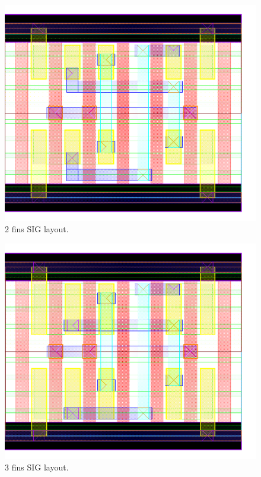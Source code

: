 \documentclass[pgmicro,mestrado,english]{iiufrgs}
\begin{document}
\begin{figure}[H]
\centering
\includegraphics[width=\textwidth,height=\textheight,keepaspectratio]{SIG2F.png}
\caption{2 fins SIG layout.}
\label{fig:SIG2F}
\end{figure}

\begin{figure}[H]
\centering
\includegraphics[width=\textwidth,height=\textheight,keepaspectratio]{SIG3F.png}
\caption{3 fins SIG layout.}
\label{fig:SIG3F}
\end{figure}
\end{document}
